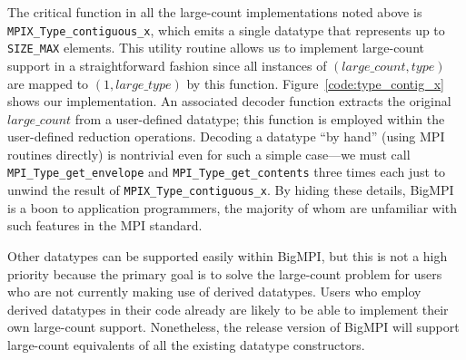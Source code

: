 The critical function in all the large-count implementations noted above
is \texttt{MPIX\_Type\_contiguous\_x}, which emits a single datatype that
represents up to \texttt{SIZE\_MAX} elements.
This utility routine allows us to implement large-count support in a straightforward
fashion since all instances of $(large\_count,type)$ are mapped to $(1,large\_type)$
by this function.  Figure~\ref{code:type_contig_x} shows our implementation.
An associated decoder function extracts the original $large\_count$ from a
user-defined datatype; this function is employed within the user-defined reduction
operations.  Decoding a datatype ``by hand'' (using MPI routines directly)
is nontrivial even for such a simple case---we
must call \texttt{MPI\_Type\_get\_envelope} and \texttt{MPI\_Type\_get\_contents}
three times each just to unwind the result of \texttt{MPIX\_Type\_contiguous\_x}.
By hiding these details,
BigMPI is a boon to application programmers, the majority of whom are unfamiliar 
with such features in the MPI standard.

Other datatypes can be supported easily within BigMPI, but this is not a high
priority because the primary goal is to solve the large-count problem for users
who are not currently making use of derived datatypes.
Users who employ derived datatypes in their code already are likely to be able
to implement their own large-count support. 
Nonetheless, the release version of BigMPI will support large-count equivalents
of all the existing datatype constructors.

